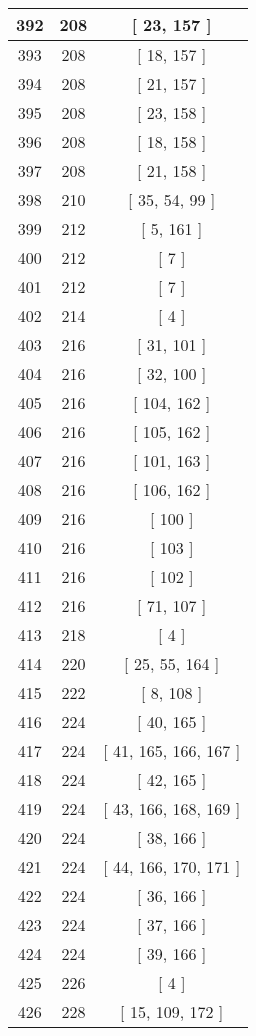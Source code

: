 \begin{center}
\begin{longtable}[H]{|| c c c ||}
\hline
392 & 208 & [ 23, 157 ] \\ 
\hline
393 & 208 & [ 18, 157 ] \\ 
\hline
394 & 208 & [ 21, 157 ] \\ 
\hline
395 & 208 & [ 23, 158 ] \\ 
\hline
396 & 208 & [ 18, 158 ] \\ 
\hline
397 & 208 & [ 21, 158 ] \\ 
\hline
398 & 210 & [ 35, 54, 99 ] \\ 
\hline
399 & 212 & [ 5, 161 ] \\ 
\hline
400 & 212 & [ 7 ] \\ 
\hline
401 & 212 & [ 7 ] \\ 
\hline
402 & 214 & [ 4 ] \\ 
\hline
403 & 216 & [ 31, 101 ] \\ 
\hline
404 & 216 & [ 32, 100 ] \\ 
\hline
405 & 216 & [ 104, 162 ] \\ 
\hline
406 & 216 & [ 105, 162 ] \\ 
\hline
407 & 216 & [ 101, 163 ] \\ 
\hline
408 & 216 & [ 106, 162 ] \\ 
\hline
409 & 216 & [ 100 ] \\ 
\hline
410 & 216 & [ 103 ] \\ 
\hline
411 & 216 & [ 102 ] \\ 
\hline
412 & 216 & [ 71, 107 ] \\ 
\hline
413 & 218 & [ 4 ] \\ 
\hline
414 & 220 & [ 25, 55, 164 ] \\ 
\hline
415 & 222 & [ 8, 108 ] \\ 
\hline
416 & 224 & [ 40, 165 ] \\ 
\hline
417 & 224 & [ 41, 165, 166, 167 ] \\ 
\hline
418 & 224 & [ 42, 165 ] \\ 
\hline
419 & 224 & [ 43, 166, 168, 169 ] \\ 
\hline
420 & 224 & [ 38, 166 ] \\ 
\hline
421 & 224 & [ 44, 166, 170, 171 ] \\ 
\hline
422 & 224 & [ 36, 166 ] \\ 
\hline
423 & 224 & [ 37, 166 ] \\ 
\hline
424 & 224 & [ 39, 166 ] \\ 
\hline
425 & 226 & [ 4 ] \\ 
\hline
426 & 228 & [ 15, 109, 172 ] \\ 

\end{longtable}
\end{center}
